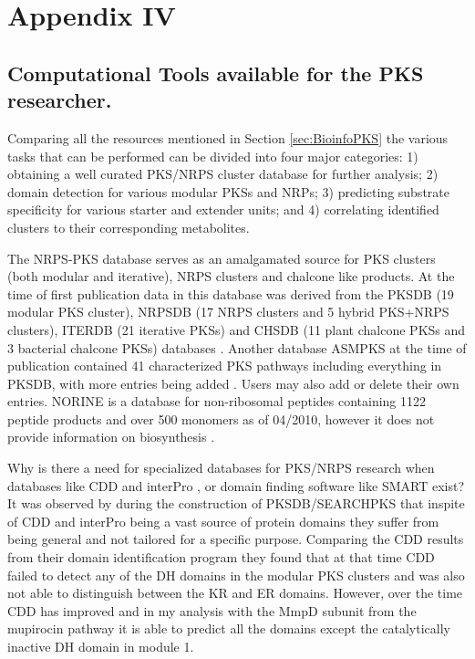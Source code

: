 \chapter{Appendix IV}
\label{cha:AppendixIV}
\begin{doublespacing}

		\section{Computational Tools available for the PKS researcher.}
		\label{sec:comptools}%
		Comparing all the resources mentioned in Section \ref{sec:BioinfoPKS} the various tasks that can be performed can be divided into four major categories: 1) obtaining a well curated PKS/NRPS cluster database for further analysis; 2) domain detection for various modular PKSs and NRPs; 3) predicting substrate specificity for various starter and extender units; and 4) correlating identified clusters to their corresponding metabolites.
		
		The NRPS-PKS database serves as an amalgamated source for PKS clusters (both modular and iterative), NRPS clusters and chalcone like products. At the time of first publication data in this database was derived from the PKSDB (19 modular PKS cluster), NRPSDB (17 NRPS clusters and 5 hybrid PKS+NRPS clusters), ITERDB (21 iterative PKSs) and CHSDB (11 plant chalcone PKSs and 3 bacterial chalcone PKSs) databases \parencite{Yadav2003a}. Another database ASMPKS at the time of publication contained 41 characterized PKS pathways including everything in PKSDB, with more entries being added \parencite{Tae2007}. Users may also add or delete their own entries. NORINE is a database for non-ribosomal peptides containing 1122 peptide products and over 500 monomers as of 04/2010, however it does not provide information on biosynthesis \parencite{Caboche2008}.
		
		Why is there a need for specialized databases for PKS/NRPS research when databases like CDD \parencite{Marchler-Bauer2011} and interPro \parencite{Hunter2012}, or domain finding software like SMART \parencite{Letunic2012} exist? It was observed by \textcite{Yadav2003} during the construction of PKSDB/SEARCHPKS that inspite of CDD and interPro being a vast source of protein domains they suffer from being general and not tailored for a specific purpose. Comparing the CDD results from their domain identification program they found that at that time CDD failed to detect any of the DH domains in the modular PKS clusters and was also not able to distinguish between the KR and ER domains. However, over the time CDD has improved and in my analysis with the MmpD subunit from the mupirocin pathway it is able to predict all the domains except the catalytically inactive DH domain in module 1.
		

\end{doublespacing}
